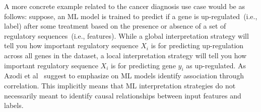 \hspace*{3.5mm} A more concrete example related to the cancer diagnosis use case would be as follows: suppose, an ML model is trained to predict if a gene is up-regulated~(i.e., label) after some treatment based on the presence or absence of a set of regulatory sequences~(i.e., features). While a global interpretation strategy will tell you how important regulatory sequence $X_i$ is for predicting up-regulation across all genes in the dataset, a local interpretation strategy will tell you how important regulatory sequence $X_i$ is for predicting gene $y_i$ as up-regulated. As Azodi et al~\cite{azodi2020opening} suggest to emphasize on ML models identify association through correlation. This implicitly means that ML interpretation strategies do not necessarily meant to identify causal relationships between input features and labels. %

